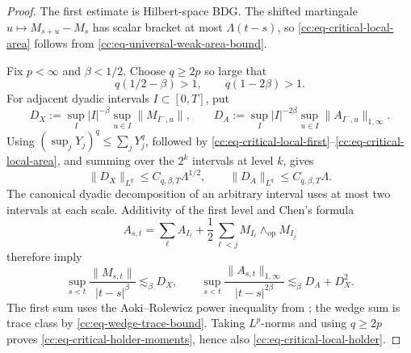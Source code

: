 \documentclass[10pt,reqno]{amsart}
\theoremstyle{plain}
\theoremstyle{definition}
\theoremstyle{remark}
\begin{document}
\begin{proof}
The first estimate is Hilbert-space BDG\@.  The shifted martingale
\(u\mapsto M_{s+u}-M_s\) has scalar bracket at most
\(\Lambda(t-s)\), so
\eqref{cc:eq-critical-local-area} follows from
\eqref{cc:eq-universal-weak-area-bound}.

Fix \(p<\infty\) and \(\beta<1/2\).  Choose
\(q\geq2p\) so large that
\[
 q(1/2-\beta)>1,
 \qquad q(1-2\beta)>1.
\]
For adjacent dyadic intervals \(I\subset[0,T]\), put
\[
 D_X:=\sup_I |I|^{-\beta}\sup_{u\in I}\|M_{I^-,u}\|,
 \qquad
 D_A:=\sup_I |I|^{-2\beta}\sup_{u\in I}
       \|A_{I^-,u}\|_{1,\infty}.
\]
Using \((\sup_jY_j)^q\leq\sum_jY_j^q\), followed by
\eqref{cc:eq-critical-local-first}--\eqref{cc:eq-critical-local-area},
and summing over the \(2^k\) intervals at level \(k\), gives
\[
 \|D_X\|_{L^q}\leq C_{q,\beta,T}\Lambda^{1/2},
 \qquad
 \|D_A\|_{L^q}\leq C_{q,\beta,T}\Lambda.
\]
The canonical dyadic decomposition of an arbitrary interval uses at most
two intervals at each scale.  Additivity of the first level and Chen's
formula
\[
 A_{s,t}=\sum_\ell A_{I_\ell}
 +\frac12\sum_{\ell<j}M_{I_\ell}\wedge_{\mathrm{op}}M_{I_j}
\]
therefore imply
\[
 \sup_{s<t}\frac{\|M_{s,t}\|}{|t-s|^\beta}
 \lesssim_\beta D_X,
 \qquad
 \sup_{s<t}\frac{\|A_{s,t}\|_{1,\infty}}{|t-s|^{2\beta}}
 \lesssim_\beta D_A+D_X^2.
\]
The first sum uses the Aoki--Rolewicz power inequality from
; the wedge sum is trace class by
\eqref{cc:eq-wedge-trace-bound}.  Taking \(L^p\)-norms and using
\(q\ge2p\) proves \eqref{cc:eq-critical-holder-moments}, hence also
\eqref{cc:eq-critical-local-holder}.
\end{proof}
\end{document}
